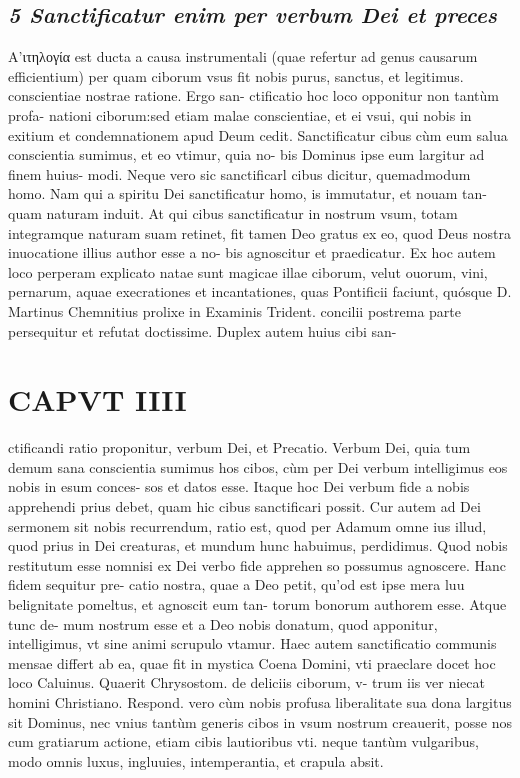 \documentclass{article}
\begin{document}
\begin{pages}
\subsection*{\textit{5 Sanctificatur enim per verbum Dei et preces }}\pstart Α’ιτηλογία est ducta a causa instrumentali (quae refertur ad genus causarum efficientium) per quam ciborum vsus fit nobis purus, sanctus, et legitimus. conscientiae nostrae ratione. Ergo san- ctificatio hoc loco opponitur non tantùm profa- nationi ciborum:sed etiam malae conscientiae, et ei vsui, qui nobis in exitium et condemnationem apud Deum cedit. Sanctificatur cibus cùm eum salua conscientia sumimus, et eo vtimur, quia no- bis Dominus ipse eum largitur ad finem huius- modi. Neque vero sic sanctificarl cibus dicitur, quemadmodum homo. Nam qui a spiritu Dei sanctificatur homo, is immutatur, et nouam tan- quam naturam induit. At qui cibus sanctificatur in nostrum vsum, totam integramque naturam suam retinet, fit tamen Deo gratus ex eo, quod Deus nostra inuocatione illius author esse a no- bis agnoscitur et praedicatur. Ex hoc autem loco perperam explicato natae sunt magicae illae ciborum, velut ouorum, vini, pernarum, aquae execrationes et incantationes, quas Pontificii faciunt, quósque D. Martinus Chemnitius prolixe in Examinis Trident. concilii postrema parte persequitur et refutat doctissime. Duplex autem huius cibi san-  \pend
\section*{CAPVT  IIII }
\marginpar{[ p.19 ]}\pstart ctificandi ratio proponitur, verbum Dei, et Precatio. Verbum Dei, quia tum demum sana conscientia sumimus hos cibos, cùm per Dei verbum intelligimus eos nobis in esum conces- sos et datos esse. Itaque hoc Dei verbum fide a nobis apprehendi prius debet, quam hic cibus sanctificari possit. Cur autem ad Dei sermonem sit nobis recurrendum, ratio est, quod per Adamum omne ius illud, quod prius in Dei creaturas, et mundum hunc habuimus, perdidimus. Quod nobis restitutum esse nomnisi ex Dei verbo fide apprehen so possumus agnoscere. Hanc fidem sequitur pre- catio nostra, quae a Deo petit, qu'od est ipse mera luu belignitate pomeltus, et agnoscit eum tan- torum bonorum authorem esse. Atque tunc de- mum nostrum esse et a Deo nobis donatum, quod apponitur, intelligimus, vt sine animi scrupulo vtamur.  \pend\pstart Haec autem sanctificatio communis mensae differt ab ea, quae fit in mystica Coena Domini, vti praeclare docet hoc loco Caluinus.  \pend\pstart Quaerit Chrysostom. de deliciis ciborum, v- trum iis ver niecat homini Christiano. Respond. vero cùm nobis profusa liberalitate sua dona largitus sit Dominus, nec vnius tantùm generis cibos in vsum nostrum creauerit, posse nos cum gratiarum actione, etiam cibis lautioribus vti. neque tantùm vulgaribus, modo omnis luxus, ingluuies, intemperantia, et crapula absit.  \pend
{}
{}

\end{pages}
\end{document}
